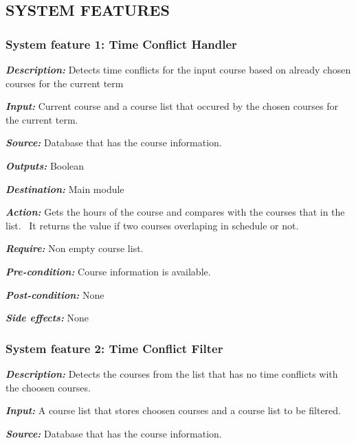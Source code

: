 \documentclass[twoside,letterpaper]{article}
\begin{document}
\bigskip

\bigskip

\clearpage\pagestyle{Standard}
\subsection[SYSTEM
FEATURES]{\rmfamily\bfseries\color{black}
SYSTEM FEATURES}

\subsubsection[System feature 1: Time Conflict Handler]{\rmfamily\bfseries\color{black} System feature 1: Time Conflict Handler}
\emph{\textbf{Description:}} Detects time conflicts for the input course based on already chosen courses for the current term 

\emph{\textbf{Input:}}  Current course and a course list that occured by the chosen courses for the current term.

\emph{\textbf{Source:}} Database that has the course information.

\emph{\textbf{Outputs:}} Boolean

\emph{\textbf{Destination:}} Main module

\emph{\textbf{Action:}} Gets the hours of the course and compares with the courses that in the list. \ It returns the value if two courses overlaping in schedule or not.

\emph{\textbf{Require:}} Non empty course list.

\emph{\textbf{Pre-condition: }} Course information is available.

\emph{\textbf{Post-condition: }} None

\emph{\textbf{Side effects:}} None

\subsubsection[System feature 2: Time Conflict Filter]{\rmfamily\bfseries\color{black} System feature 2: Time Conflict Filter}
\emph{\textbf{Description:}} Detects the courses from the list that has no time conflicts with the choosen courses. 

\emph{\textbf{Input:}}  A course list that stores choosen courses and a course list to be filtered.

\emph{\textbf{Source:}} Database that has the course information.
\end{document}
